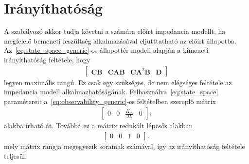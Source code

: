 \chapter{Irányíthatóság}\label{chap:controllability}
A szabályozó akkor tudja követni a számára előírt impedancia modellt, 
ha megfelelő bemeneti feszültség alkalmazásával eljutttatható az előírt állapotba. 
Az~\eqref{eq:state_space_generic}-os állapottér modell alapján a kimeneti irányíthatóság feltétele, hogy
\begin{align}\label{eq:observability_generic}
    \left[\begin{array}{c|c|c|c}
        \bm{CB} & \bm{CAB} & \bm C \bm A^2 \bm B & \bm D
    \end{array}\right]
\end{align}
legyen maximális rangú. Ez csak egy szükséges, de nem elégséges feltétele az impedancia modell alkalmazhatóságának.
Felhasználva~\eqref{eq:state_space} paramétereit a~\eqref{eq:observability_generic}-es feltételben szereplő mátrix
\begin{align}
    \begin{bmatrix}
        0 & 0 & \frac{K_m}{JL} & 0
    \end{bmatrix},
\end{align}
alakba írható át. Továbbá ez a mátrix redukált lépcsős alakban
\begin{align}
    \begin{bmatrix}
        0 & 0 & 1 & 0
    \end{bmatrix},
\end{align}
mely mátrix rangja megegyezik sorainak számával, így az irányíthatóság feltétele teljesül.